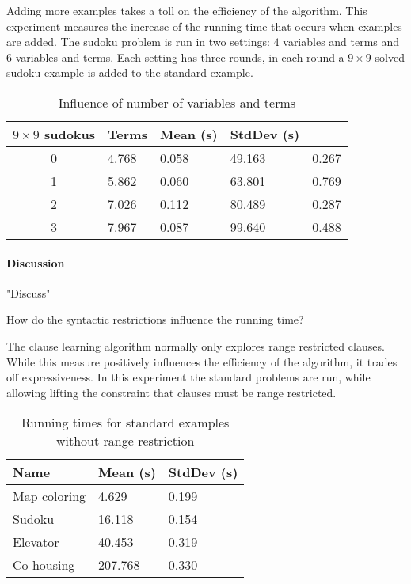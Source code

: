 \begin{experiment}
	Adding more examples takes a toll on the efficiency of the algorithm.
	This experiment measures the increase of the running time that occurs when examples are added.
	The sudoku problem is run in two settings: $4$ variables and terms and $6$ variables and terms.
	Each setting has three rounds, in each round a $9 \times 9$ solved sudoku example is added to the standard example.

	\begin{table}[!htp]
		\begin{tabularx}{\textwidth}{c|XX|XX}
			\textbf{$9 \times 9$ sudokus} & \textbf{Terms}	& \textbf{Mean (s)} & \textbf{StdDev (s)} \\
			\toprule
			0 & 4.768 & 0.058	& 49.163	& 0.267	\\
			1 & 5.862 & 0.060	& 63.801	& 0.769	\\
			2 & 7.026 & 0.112	& 80.489	& 0.287	\\
			3 & 7.967 & 0.087	& 99.640	& 0.488	\\
		\end{tabularx}
		\label{tbl:cd_speed_examples}
		\caption{Influence of number of variables and terms}
	\end{table}
\end{experiment}

\paragraph{Discussion}
"Discuss"

\begin{question}
	How do the syntactic restrictions influence the running time?
\end{question}

\begin{experiment}
	The clause learning algorithm normally only explores range restricted clauses.
	While this measure positively influences the efficiency of the algorithm, it trades off expressiveness.
	In this experiment the standard problems are run, while allowing lifting the constraint that clauses must be range restricted.

	\begin{table}[!htp]
		\begin{tabularx}{\textwidth}{XXX}
			\textbf{Name}	& \textbf{Mean (s)}	& \textbf{StdDev (s)} \\
			\toprule
			Map coloring 	& 4.629				& 0.199 \\
			Sudoku 			& 16.118			& 0.154 \\
			Elevator 		& 40.453 			& 0.319 \\
			Co-housing 		& 207.768			& 0.330
		\end{tabularx}
		\label{tbl:exp_speed_no_range}
		\caption{Running times for standard examples without range restriction}
	\end{table}

\end{experiment}

